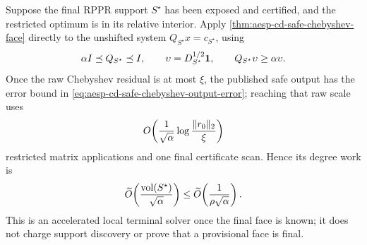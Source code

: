 \begin{corollary}
\label{cor:aesp-cd-final-face-chebyshev}
Suppose the final RPPR support $S^\star$ has been exposed and certified, and
the restricted optimum is in its relative interior.  Apply
\cref{thm:aesp-cd-safe-chebyshev-face} directly to the unshifted system
$Q_{S^\star}x=c_{S^\star}$, using
\begin{equation*}
 \alpha I\preceq Q_{S^\star}\preceq I,
 \qquad
 \upsilon=D_{S^\star}^{1/2}\mathbf{1},
 \qquad
 Q_{S^\star}\upsilon\geq\alpha\upsilon.
\end{equation*}
Once the raw Chebyshev residual is at most $\xi$, the published safe output
has the error bound in
\cref{eq:aesp-cd-safe-chebyshev-output-error}; reaching that raw scale uses
\begin{equation}
 O\!\left(\frac1{\sqrt\alpha}
   \log\frac{\lVert r_0\rVert_2}{\xi}\right)
 \label{eq:aesp-cd-final-face-chebyshev-work}
\end{equation}
restricted matrix applications and one final certificate scan.  Hence its
degree work is
\begin{equation*}
 \widetilde O\!\left(
   \frac{\operatorname{vol}(S^\star)}{\sqrt\alpha}\right)
 \leq
 \widetilde O\!\left(\frac1{\rho\sqrt\alpha}\right).
\end{equation*}
This is an accelerated local terminal solver once the final face is known;
it does not charge support discovery or prove that a provisional face is
final.
\end{corollary}

